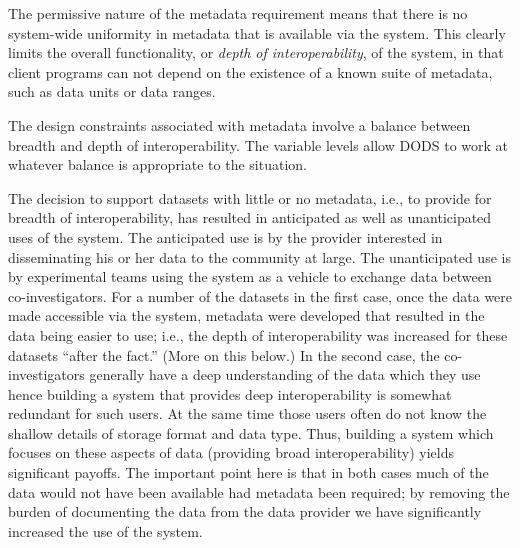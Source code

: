 \documentclass[12pt]{article}
\begin{document}
The permissive nature of the metadata requirement means that there is no
system-wide uniformity in metadata that is available via the system. This
clearly limits the overall functionality, or \emph{depth of
  interoperability}, of the system, in that client programs can not depend on
the existence of a known suite of metadata, such as data units or data
ranges.

The design constraints associated with metadata involve a balance between
breadth and depth of interoperability. The variable levels allow \acs{DODS} 
to work at whatever balance is appropriate to the situation.

The decision to support datasets with little or no metadata, i.e., to provide
for breadth of interoperability, has resulted in anticipated as well as
unanticipated uses of the system. The anticipated use is by the provider
interested in disseminating his or her data to the community at large. The
unanticipated use is by experimental teams using the system as a vehicle to
exchange data between co-investigators. For a number of the datasets in the
first case, once the data were made accessible via the system, metadata were
developed that resulted in the data being easier to use; i.e., the depth of
interoperability was increased for these datasets ``after the fact.'' (More
on this below.) In the second case, the co-investigators generally have a
deep understanding of the data which they use hence building a system that
provides deep interoperability is somewhat redundant for such users. At the
same time those users often do not know the shallow details of storage format
and data type.  Thus, building a system which focuses on these aspects of
data (providing broad interoperability) yields significant payoffs.  The
important point here is that in both cases much of the data would not have
been available had metadata been required; by removing the burden of
documenting the data from the data provider we have significantly increased
the use of the system.
\end{document}
